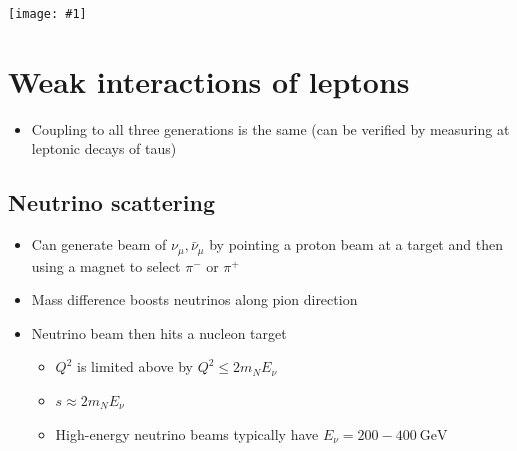 \documentclass[11pt]{article}
\newcommand{\nubar}{{\bar{\nu}}}
\newcommand{\gev}{\text{GeV}}
\newcommand{\embedimgw}[2]{\begin{center}\texttt{[image: \#1]}\end{center}}
\begin{document}
\begin{itemize}
  \embedimgw{figs/pioncp.png}{.6}
\end{itemize}

\section{Weak interactions of leptons}
\begin{itemize}
  \item Coupling to all three generations is the same (can be verified by measuring at leptonic decays of taus)
\end{itemize}

\subsection{Neutrino scattering}
\begin{itemize}
  \item Can generate beam of $\nu_\mu,\nubar_\mu$ by pointing a proton beam at a target and then using a magnet to select $\pi^-$ or $\pi^+$ 
  \item Mass difference boosts neutrinos along pion direction
  \item Neutrino beam then hits a nucleon target
  \begin{itemize}
    \item $Q^2$ is limited above by $Q^2 \leq 2m_NE_\nu$
    \item $s \approx 2m_NE_\nu$
    \item High-energy neutrino beams typically have $E_\nu = 200-400~\gev$
  \end{itemize}
\end{itemize}
\end{document}
